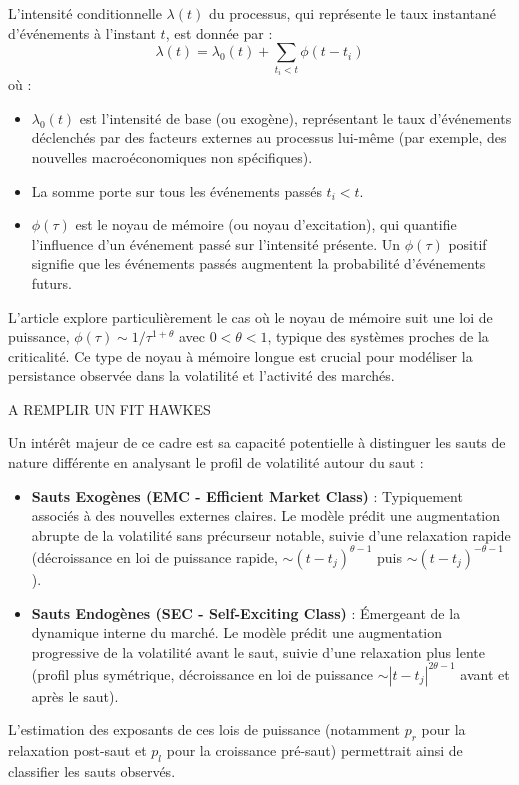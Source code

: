 \documentclass[10pt,a4paper]{article}
\theoremstyle{definition}
\theoremstyle{remark}
\begin{document}
\begin{itemize}
    L'intensité conditionnelle $\lambda(t)$ du processus, qui représente le taux instantané d'événements à l'instant $t$, est donnée par \cite{marcaccioli2021exogenous} :
    \begin{equation}
    \lambda(t) = \lambda_0(t) + \sum_{t_i < t} \phi(t-t_i)
    \end{equation}
    où :
    \begin{itemize}
        \item $\lambda_0(t)$ est l'intensité de base (ou exogène), représentant le taux d'événements déclenchés par des facteurs externes au processus lui-même (par exemple, des nouvelles macroéconomiques non spécifiques).
        \item La somme porte sur tous les événements passés $t_i < t$.
        \item $\phi(\tau)$ est le noyau de mémoire (ou noyau d'excitation), qui quantifie l'influence d'un événement passé sur l'intensité présente. Un $\phi(\tau)$ positif signifie que les événements passés augmentent la probabilité d'événements futurs.
    \end{itemize}

    L'article \cite{marcaccioli2021exogenous} explore particulièrement le cas où le noyau de mémoire suit une loi de puissance, $\phi(\tau) \sim 1/\tau^{1+\theta}$ avec $0 < \theta < 1$, typique des systèmes proches de la criticalité. Ce type de noyau à mémoire longue est crucial pour modéliser la persistance observée dans la volatilité et l'activité des marchés.

    A REMPLIR UN FIT HAWKES

    Un intérêt majeur de ce cadre est sa capacité potentielle à distinguer les sauts de nature différente en analysant le profil de volatilité autour du saut :
    \begin{itemize}
        \item \textbf{Sauts Exogènes (EMC - Efficient Market Class)} : Typiquement associés à des nouvelles externes claires. Le modèle prédit une augmentation abrupte de la volatilité sans précurseur notable, suivie d'une relaxation rapide (décroissance en loi de puissance rapide, $\sim (t-t_j)^{\theta-1}$ puis $\sim (t-t_j)^{-\theta-1}$).
        \item \textbf{Sauts Endogènes (SEC - Self-Exciting Class)} : Émergeant de la dynamique interne du marché. Le modèle prédit une augmentation progressive de la volatilité avant le saut, suivie d'une relaxation plus lente (profil plus symétrique, décroissance en loi de puissance $\sim |t-t_j|^{2\theta-1}$ avant et après le saut).
    \end{itemize}
    L'estimation des exposants de ces lois de puissance (notamment $p_r$ pour la relaxation post-saut et $p_l$ pour la croissance pré-saut) permettrait ainsi de classifier les sauts observés.


\end{itemize}
\end{document}
